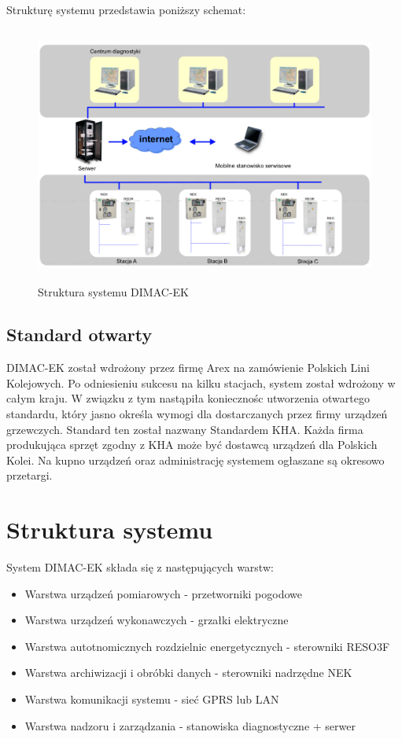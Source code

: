 Strukturę systemu przedstawia poniższy schemat:
\begin{figure}[h]
	\includegraphics[height=85mm]{./img/dimacek_struktura.png}
	\caption{Struktura systemu DIMAC-EK}
	\label{fig:dimacek-scheme}
\end{figure}

\subsection{Standard otwarty}
DIMAC-EK został wdrożony przez firmę Arex na zamówienie Polskich Lini Kolejowych. Po odniesieniu sukcesu na kilku stacjach, system został wdrożony w całym kraju. W związku z tym nastąpiła koniecznośc utworzenia otwartego standardu, który jasno określa wymogi dla dostarczanych przez firmy urządzeń grzewczych. Standard ten został nazwany Standardem KHA. Każda firma produkująca sprzęt zgodny z KHA może być dostawcą urządzeń dla Polskich Kolei. Na kupno urządzeń oraz administrację systemem ogłaszane są okresowo przetargi.

\section{Struktura systemu}
System DIMAC-EK składa się z następujących warstw:\cite{dimacek-wytyczne}
\begin{itemize}
\item Warstwa urządzeń pomiarowych - przetworniki pogodowe
\item Warstwa urządzeń wykonawczych - grzałki elektryczne
\item Warstwa autotnomicznych rozdzielnic energetycznych - sterowniki RESO3F
\item Warstwa archiwizacji i obróbki danych - sterowniki nadrzędne NEK
\item Warstwa komunikacji systemu - sieć GPRS lub LAN
\item Warstwa nadzoru i zarządzania - stanowiska diagnostyczne + serwer
\end{itemize}


